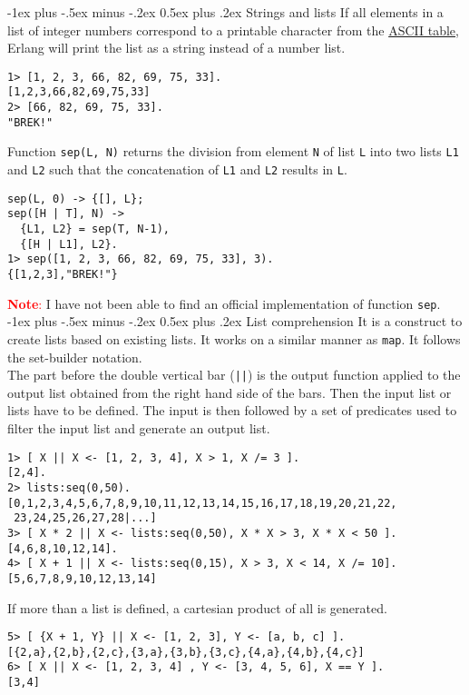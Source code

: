 \documentclass[10pt,landscape]{article}
\makeatletter
\renewcommand{\section}{\@startsection{section}{1}{0mm}%
                                {-1ex plus -.5ex minus -.2ex}%
                                {0.5ex plus .2ex}%
                                {\normalfont\large\bfseries}}
\makeatother
\begin{document}
\begin{multicols}{3}
\section{Strings and lists}
If all elements in a list of integer numbers correspond to a printable character from the \href{http://www.asciitable.com/}{ASCII table}, Erlang will print the list as a string instead of a number list.
\begin{verbatim}
1> [1, 2, 3, 66, 82, 69, 75, 33].
[1,2,3,66,82,69,75,33]
2> [66, 82, 69, 75, 33].
"BREK!"
\end{verbatim}
Function \texttt{sep(L, N)} returns the division from element \texttt{N} of list \texttt{L} into two lists \texttt{L1} and \texttt{L2} such that the concatenation of \texttt{L1} and \texttt{L2} results in \texttt{L}.
\begin{verbatim}
sep(L, 0) -> {[], L};
sep([H | T], N) ->
  {L1, L2} = sep(T, N-1),
  {[H | L1], L2}.
1> sep([1, 2, 3, 66, 82, 69, 75, 33], 3).
{[1,2,3],"BREK!"}
\end{verbatim}
\textcolor{red}{\textbf{Note}:} I have not been able to find an official implementation of function \texttt{sep}.
\section{List comprehension}
It is a construct to create lists based on existing lists. It works on a similar manner as \texttt{map}. It follows the set-builder notation. \\
The part before the double vertical bar (\texttt{||}) is the output function applied to the output list obtained from the right hand side of the bars. Then the input list or lists have to be defined. The input is then followed by a set of predicates used to filter the input list and generate an output list.
\begin{verbatim}
1> [ X || X <- [1, 2, 3, 4], X > 1, X /= 3 ].
[2,4].
2> lists:seq(0,50).
[0,1,2,3,4,5,6,7,8,9,10,11,12,13,14,15,16,17,18,19,20,21,22,
 23,24,25,26,27,28|...]
3> [ X * 2 || X <- lists:seq(0,50), X * X > 3, X * X < 50 ].
[4,6,8,10,12,14].
4> [ X + 1 || X <- lists:seq(0,15), X > 3, X < 14, X /= 10].
[5,6,7,8,9,10,12,13,14]
\end{verbatim}
If more than a list is defined, a cartesian product of all is generated.
\begin{verbatim}
5> [ {X + 1, Y} || X <- [1, 2, 3], Y <- [a, b, c] ].
[{2,a},{2,b},{2,c},{3,a},{3,b},{3,c},{4,a},{4,b},{4,c}]
6> [ X || X <- [1, 2, 3, 4] , Y <- [3, 4, 5, 6], X == Y ].
[3,4]
\end{verbatim}

\end{multicols}
\end{document}
